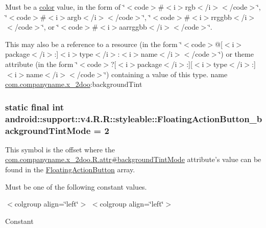 Must be a \hyperlink{classandroid_1_1support_1_1v4_1_1_r_1_1color}{color} value, in the form of \char`\"{}$<$code$>$\#$<$i$>$rgb$<$/i$>$$<$/code$>$\char`\"{}, \char`\"{}$<$code$>$\#$<$i$>$argb$<$/i$>$$<$/code$>$\char`\"{}, \char`\"{}$<$code$>$\#$<$i$>$rrggbb$<$/i$>$$<$/code$>$\char`\"{}, or \char`\"{}$<$code$>$\#$<$i$>$aarrggbb$<$/i$>$$<$/code$>$\char`\"{}. 

This may also be a reference to a resource (in the form \char`\"{}$<$code$>$@\mbox{[}$<$i$>$package$<$/i$>$:\mbox{]}$<$i$>$type$<$/i$>$:$<$i$>$name$<$/i$>$$<$/code$>$\char`\"{}) or theme attribute (in the form \char`\"{}$<$code$>$?\mbox{[}$<$i$>$package$<$/i$>$:\mbox{]}\mbox{[}$<$i$>$type$<$/i$>$:\mbox{]}$<$i$>$name$<$/i$>$$<$/code$>$\char`\"{}) containing a value of this type.  name \hyperlink{namespacecom_1_1companyname_1_1x__2doo}{com.companyname.x\_\-2doo}:backgroundTint \hypertarget{classandroid_1_1support_1_1v4_1_1_r_1_1styleable_c8d02e9d241d20ca06568db8e4b38c1c}{
\subsubsection[{FloatingActionButton\_\-backgroundTintMode}]{\setlength{\rightskip}{0pt plus 5cm}static final int android::support::v4.R.R::styleable::FloatingActionButton\_\-backgroundTintMode = 2}}
\label{classandroid_1_1support_1_1v4_1_1_r_1_1styleable_c8d02e9d241d20ca06568db8e4b38c1c}


This symbol is the offset where the \hyperlink{classcom_1_1companyname_1_1x__2doo_1_1_r_1_1attr_506bd205bde05e75b64eae0de40e1b7b}{com.companyname.x\_\-2doo.R.attr\#backgroundTintMode} attribute's value can be found in the \hyperlink{classandroid_1_1support_1_1v4_1_1_r_1_1styleable_51a0276d7190a1195d58170b1623ab3c}{FloatingActionButton} array.

Must be one of the following constant values. \begin{TabularC}{0}
\hline
\end{TabularC}
$<$colgroup align=\char`\"{}left\char`\"{}$>$ $<$colgroup align=\char`\"{}left\char`\"{}$>$ 

Constant

